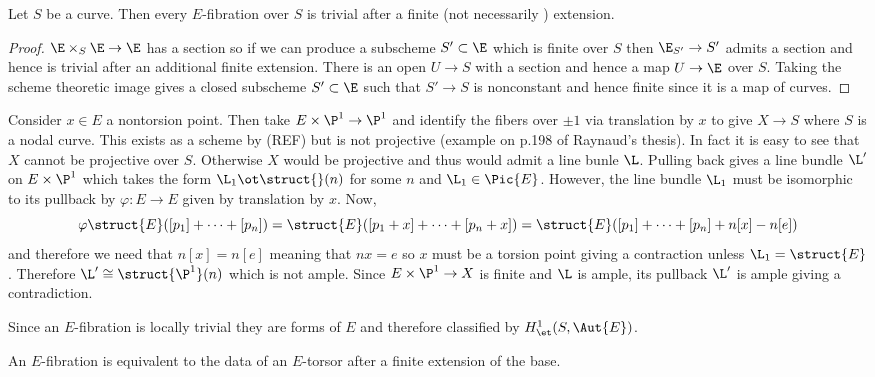 \documentclass[12pt]{article}
\begin{document}
\begin{prop}
Let $S$ be a curve. Then every $E$-fibration over $S$ is trivial after a finite (not necessarily \etale) extension.
\end{prop}

\begin{proof}
$\E \times_S \E \to \E$ has a section so if we can produce a subscheme $S' \subset \E$ which is finite over $S$ then $\E_{S'} \to S'$ admits a section and hence is trivial after an additional finite \etale extension. There is an \etale open $U \to S$ with a section and hence a map $U \to \E$ over $S$. Taking the scheme theoretic image gives a closed subscheme $S' \subset \E$ such that $S' \to S$ is nonconstant and hence finite since it is a map of curves. 
\end{proof}

\begin{example}
Consider $x \in E$ a nontorsion point. Then take $E \times \P^1 \to \P^1$ and identify the fibers over $\pm 1$ via translation by $x$ to give $X \to S$ where $S$ is a nodal curve. This exists as a scheme by (REF) but is not projective (example on p.198 of Raynaud's thesis). In fact it is easy to see that $X$ cannot be projective over $S$. Otherwise $X$ would be projective and thus would admit a line bunle $\L$. Pulling back gives a line bundle $\L'$ on $E \times \P^1$ which takes the form $\L_1 \ot \struct{}(n)$ for some $n$ and $\L_1 \in \Pic{E}$. However, the line bundle $\L_1$ must be isomorphic to its pullback by $\varphi : E \to E$ given by translation by $x$. Now, 
\[ \varphi \struct{E}([p_1] + \cdots + [p_n]) = \struct{E}([p_1 + x] + \cdots + [p_n + x]) = \struct{E}([p_1] + \cdots + [p_n] + n [x] - n [e]) \]
and therefore we need that $n [x] = n[e]$ meaning that $nx = e$ so $x$ must be a torsion point giving a contraction unless $\L_1 = \struct{E}$. Therefore $\L' \cong \struct{\P^1}(n)$ which is not ample. Since $E \times \P^1 \to X$ is finite and $\L$ is ample, its pullback $\L'$ is ample giving a contradiction. 
\end{example}

\begin{rmk}
Since an $E$-fibration is \etale locally trivial they are forms of $E$ and therefore classified by $H^1_{\et}(S, \Aut{E})$. 
\end{rmk}

\begin{prop}
An $E$-fibration is equivalent to the data of an $E$-torsor after a finite \etale extension of the base.
\end{prop}
\end{document}
